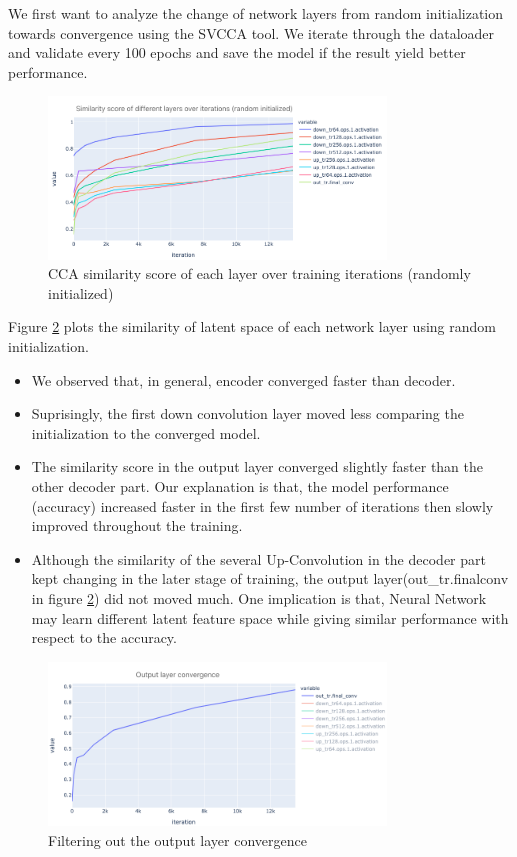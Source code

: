 We first want to analyze the change of network layers from random initialization towards convergence using the SVCCA tool. We iterate through the dataloader and validate every 100 epochs and save the model if the result yield better performance.\\
\begin{figure}
	\centering
	\includegraphics[width=0.8\textwidth]{img/SVCCA/CCA_score_scratch.png}
	\caption{CCA similarity score of each layer over training iterations (randomly initialized)}
	\label{fig:random_init_converge}
\end{figure}

Figure \ref{fig:random_init_converge} plots the similarity of latent space of each network layer using random initialization. 
\begin{itemize}
	\item We observed that, in general, encoder converged faster than decoder.
	\item Suprisingly, the first down convolution layer moved less comparing the initialization to the converged model.
	\item The similarity score in the output layer converged slightly faster than the other decoder part. Our explanation is that, the model performance (accuracy) increased faster in the first few number of iterations then slowly improved throughout the training.
	\item Although the similarity of the several Up-Convolution in the decoder part kept changing in the later stage of training, the output layer(out\_tr.finalconv in figure \ref{fig:random_init_converge}) did not moved much. One implication is that, Neural Network may learn different latent feature space while giving similar performance with respect to the accuracy.
\end{itemize}

\begin{figure}
	\centering
	\includegraphics[width=0.8\textwidth]{img/SVCCA/from_scratch_output_layer.png}
	\caption{Filtering out the output layer convergence}
	\label{fig:random_init_converge}
\end{figure}

